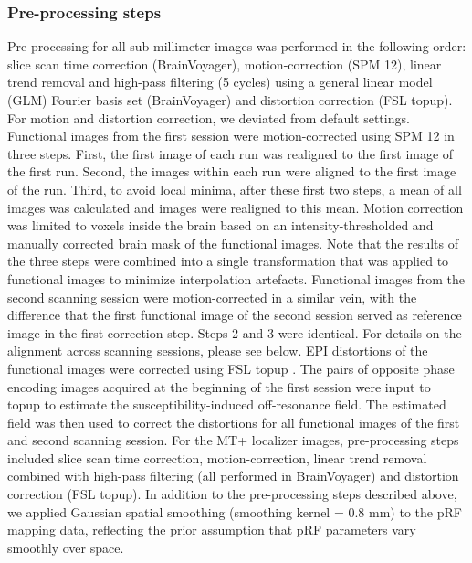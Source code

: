 \subsubsection{Pre-processing steps}
Pre-processing for all sub-millimeter images was performed in the following order: slice scan time correction (BrainVoyager), motion-correction (SPM 12), linear trend removal and high-pass filtering (5 cycles) using a general linear model (GLM) Fourier basis set (BrainVoyager) and distortion correction (FSL topup). For motion and distortion correction, we deviated from default settings. Functional images from the first session were motion-corrected using SPM 12 in three steps. First, the first image of each run was realigned to the first image of the first run. Second, the images within each run were aligned to the first image of the run. Third, to avoid local minima, after these first two steps, a mean of all images was calculated and images were realigned to this mean. Motion correction was limited to voxels inside the brain based on an intensity-thresholded and manually corrected brain mask of the functional images. Note that the results of the three steps were combined into a single transformation that was applied to functional images to minimize interpolation artefacts. Functional images from the second scanning session were motion-corrected in a similar vein, with the difference that the first functional image of the second session served as reference image in the first correction step. Steps 2 and 3 were identical. For details on the alignment across scanning sessions, please see below. EPI distortions of the functional images were corrected using FSL topup \parencite{Andersson2003, Smith2004}. The pairs of opposite phase encoding images acquired at the beginning of the first session were input to topup to estimate the susceptibility-induced off-resonance field. The estimated field was then used to correct the distortions for all functional images of the first and second scanning session. For the MT+ localizer images, pre-processing steps included slice scan time correction, motion-correction, linear trend removal combined with high-pass filtering (all performed in BrainVoyager) and distortion correction (FSL topup). In addition to the pre-processing steps described above, we applied Gaussian spatial smoothing (smoothing kernel = 0.8 mm) to the pRF mapping data, reflecting the prior assumption that pRF parameters vary smoothly over space.

